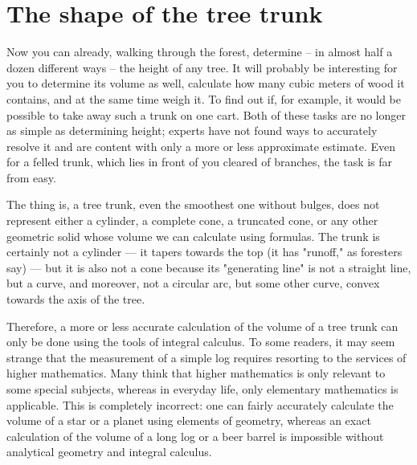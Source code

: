 \section{The shape of the tree trunk}
\label{sec-1.10}

Now you can already, walking through the forest, determine -- in almost half a dozen different ways -- the height of any tree. It will probably be interesting for you to determine its volume as well, calculate how many cubic meters of wood it contains, and at the same time weigh it. To find out if, for example, it would be possible to take away such a trunk on one cart. Both of these tasks are no longer as simple as determining height; experts have not found ways to accurately resolve it and are content with only a more or less approximate estimate. Even for a felled trunk, which lies in front of you cleared of branches, the task is far from easy.

The thing is, a tree trunk, even the smoothest one without bulges, does not represent either a cylinder, a complete cone, a truncated cone, or any other geometric solid whose volume we can calculate using formulas. The trunk is certainly not a cylinder — it tapers towards the top (it has "runoff," as foresters say) — but it is also not a cone because its "generating line" is not a straight line, but a curve, and moreover, not a circular arc, but some other curve, convex towards the axis of the tree.

Therefore, a more or less accurate calculation of the volume of a tree trunk can only be done using the tools of integral calculus. To some readers, it may seem strange that the measurement of a simple log requires resorting to the services of higher mathematics. Many think that higher mathematics is only relevant to some special subjects, whereas in everyday life, only elementary mathematics is applicable. This is completely incorrect: one can fairly accurately calculate the volume of a star or a planet using elements of geometry, whereas an exact calculation of the volume of a long log or a beer barrel is impossible without analytical geometry and integral calculus.

